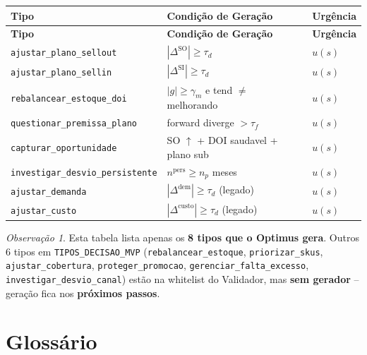 \documentclass[a4paper, 12pt]{report}
\theoremstyle{definition}
\theoremstyle{remark}
\newtheorem{observacao}{Observa\c{c}\~ao}[chapter]
\newcommand{\abs}[1]{\left|#1\right|}
\begin{document}
\begin{longtable}{lll}
  \toprule
  \textbf{Tipo} & \textbf{Condi\c{c}\~ao de Gera\c{c}\~ao} & \textbf{Urg\^encia} \\
  \midrule
  \endfirsthead
  \toprule
  \textbf{Tipo} & \textbf{Condi\c{c}\~ao de Gera\c{c}\~ao} & \textbf{Urg\^encia} \\
  \midrule
  \endhead
  \texttt{ajustar\_plano\_sellout} & $\abs{\Delta^{\text{SO}}} \geq \tau_d$ & $u(s)$ \\
  \texttt{ajustar\_plano\_sellin} & $\abs{\Delta^{\text{SI}}} \geq \tau_d$ & $u(s)$ \\
  \texttt{rebalancear\_estoque\_doi} & $\abs{g} \geq \gamma_m$ e tend $\neq$ melhorando & $u(s)$ \\
  \texttt{questionar\_premissa\_plano} & forward diverge $> \tau_f$ & $u(s)$ \\
  \texttt{capturar\_oportunidade} & SO $\uparrow$ + DOI saudavel + plano sub & $u(s)$ \\
  \texttt{investigar\_desvio\_persistente} & $n^{\text{pers}} \geq n_p$ meses & $u(s)$ \\
  \texttt{ajustar\_demanda} & $\abs{\Delta^{\text{dem}}} \geq \tau_d$ (legado) & $u(s)$ \\
  \texttt{ajustar\_custo} & $\abs{\Delta^{\text{custo}}} \geq \tau_d$ (legado) & $u(s)$ \\
  \bottomrule
\end{longtable}

\begin{observacao}
  Esta tabela lista apenas os \textbf{8 tipos que o Optimus gera}.
  Outros 6 tipos em \texttt{TIPOS\_DECISAO\_MVP}
  (\texttt{rebalancear\_estoque}, \texttt{priorizar\_skus},
  \texttt{ajustar\_cobertura}, \texttt{proteger\_promocao},
  \texttt{gerenciar\_falta\_excesso},
  \texttt{investigar\_desvio\_canal}) est\~ao na whitelist do
  Validador, mas \textbf{sem gerador} -- gera\c{c}\~ao fica nos
  \textbf{pr\'oximos passos}.
\end{observacao}


\chapter{Gloss\'ario}
\end{document}
